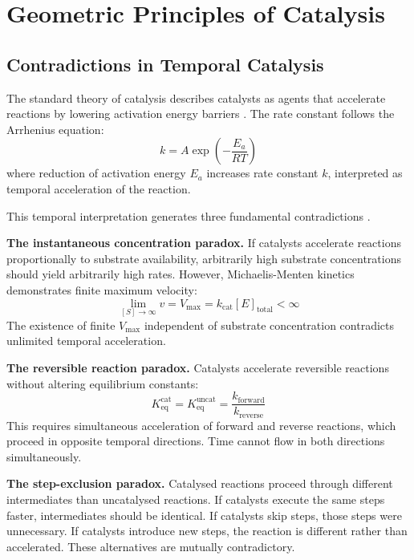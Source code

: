 \section{Geometric Principles of Catalysis}
\label{sec:catalysis}

\subsection{Contradictions in Temporal Catalysis}

The standard theory of catalysis describes catalysts as agents that accelerate reactions by lowering activation energy barriers \citep{eyring1935, pauling1946}. The rate constant follows the Arrhenius equation:
\begin{equation}
k = A \exp\left(-\frac{E_a}{RT}\right)
\label{eq:arrhenius}
\end{equation}
where reduction of activation energy $E_a$ increases rate constant $k$, interpreted as temporal acceleration of the reaction.

This temporal interpretation generates three fundamental contradictions \citep{sachikonye2024catalysis}.

\textbf{The instantaneous concentration paradox.} If catalysts accelerate reactions proportionally to substrate availability, arbitrarily high substrate concentrations should yield arbitrarily high rates. However, Michaelis-Menten kinetics demonstrates finite maximum velocity:
\begin{equation}
\lim_{[S] \to \infty} v = V_{\max} = k_{\mathrm{cat}}[E]_{\mathrm{total}} < \infty
\end{equation}
The existence of finite $V_{\max}$ independent of substrate concentration contradicts unlimited temporal acceleration.

\textbf{The reversible reaction paradox.} Catalysts accelerate reversible reactions without altering equilibrium constants:
\begin{equation}
K_{\mathrm{eq}}^{\mathrm{cat}} = K_{\mathrm{eq}}^{\mathrm{uncat}} = \frac{k_{\mathrm{forward}}}{k_{\mathrm{reverse}}}
\end{equation}
This requires simultaneous acceleration of forward and reverse reactions, which proceed in opposite temporal directions. Time cannot flow in both directions simultaneously.

\textbf{The step-exclusion paradox.} Catalysed reactions proceed through different intermediates than uncatalysed reactions. If catalysts execute the same steps faster, intermediates should be identical. If catalysts skip steps, those steps were unnecessary. If catalysts introduce new steps, the reaction is different rather than accelerated. These alternatives are mutually contradictory.

